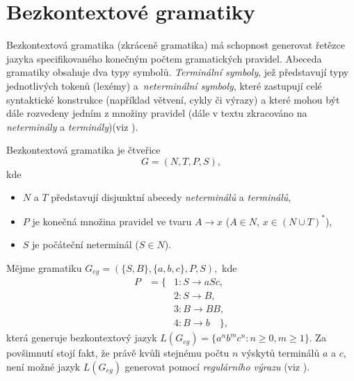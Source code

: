 \section{Bezkontextové gramatiky} \label{sectionBezkontextGramatiky}
Bezkontextová gramatika (zkráceně gramatika) má schopnost generovat řetězce jazyka specifikovaného konečným počtem gramatických pravidel.
Abeceda gramatiky obsahuje dva typy symbolů. \emph{Terminální symboly}, jež představují typy jednotlivých tokenů (lexémy) a~\emph{neterminální symboly},
které zastupují celé syntaktické konstrukce (například větvení, cykly či výrazy) a které mohou být dále rozvedeny
jedním z množiny pravidel (dále v textu zkracováno na \emph{neterminály} a \emph{terminály})(viz \cite{Meduna:2000:AutomataAndLanguages}).

\begin{definice} \label{defGram}
  Bezkontextová gramatika je čtveřice
  $$G = (N, T, P, S),$$ kde
  \begin{itemize}
    \item $N$ a $T$ představují disjunktní abecedy \emph{neterminálů} a \emph{terminálů},
    \item $P$ je konečná množina pravidel ve tvaru $A \rightarrow x$ ($A \in N$, $x \in (N \cup T)^*$),
    \item $S$ je počáteční neterminál ($S \in N$).
  \end{itemize}

\end{definice}

\begin{priklad} \label{prikladGramatika}
  Mějme gramatiku $G_{eg} = (\{S, B\}, \{a, b, c\}, P, S),$ kde
  \begin{eqnarray*}
    P & = \{ & 1\!: S \rightarrow a S c, \\
      &      & 2\!: S \rightarrow B, \\
      &      & 3\!: B \rightarrow B B, \\
      &      & 4\!: B \rightarrow b\quad\},
  \end{eqnarray*}
  která generuje bezkontextový jazyk $L(G_{eg}) = \{a^nb^mc^n\!: n \geq 0, m \geq 1\}$. Za povšimnutí stojí fakt, že právě kvůli
  stejnému počtu $n$ výskytů terminálů $a$ a $c$, není možné jazyk $L(G_{eg})$ generovat pomocí \emph{regulárního výrazu} (viz \cite{Ceska:2020:TeoretickaInformatikaTIN}).
\end{priklad}

